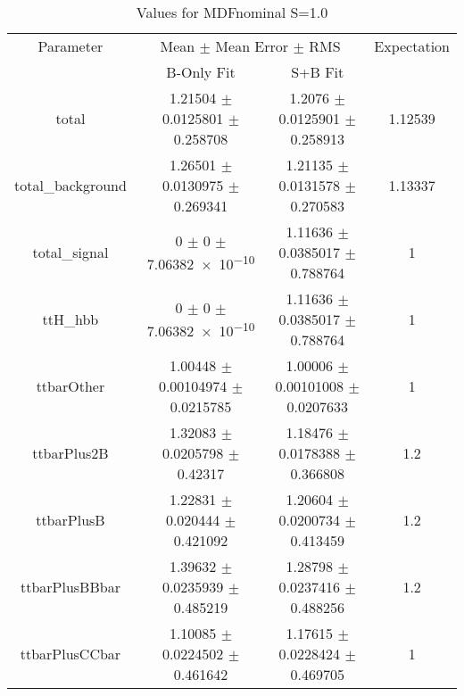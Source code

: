 \begin{table}
\centering
\caption{Values for MDFnominal S=1.0}
\begin{tabular}{cccc}
\toprule
Parameter & \multicolumn{2}{c}{Mean $\pm$ Mean Error $\pm$ RMS} & Expectation\\
 & B-Only Fit & S+B Fit & \\
\midrule
total & \num{1.21504} $\pm$ \num{0.0125801} $\pm$ \num{0.258708} & \num{1.2076} $\pm$ \num{0.0125901} $\pm$ \num{0.258913} & \num{1.12539}\\
total\_background & \num{1.26501} $\pm$ \num{0.0130975} $\pm$ \num{0.269341} & \num{1.21135} $\pm$ \num{0.0131578} $\pm$ \num{0.270583} & \num{1.13337}\\
total\_signal & \num{0} $\pm$ \num{0} $\pm$ \num{7.06382e-10} & \num{1.11636} $\pm$ \num{0.0385017} $\pm$ \num{0.788764} & \num{1}\\
ttH\_hbb & \num{0} $\pm$ \num{0} $\pm$ \num{7.06382e-10} & \num{1.11636} $\pm$ \num{0.0385017} $\pm$ \num{0.788764} & \num{1}\\
ttbarOther & \num{1.00448} $\pm$ \num{0.00104974} $\pm$ \num{0.0215785} & \num{1.00006} $\pm$ \num{0.00101008} $\pm$ \num{0.0207633} & \num{1}\\
ttbarPlus2B & \num{1.32083} $\pm$ \num{0.0205798} $\pm$ \num{0.42317} & \num{1.18476} $\pm$ \num{0.0178388} $\pm$ \num{0.366808} & \num{1.2}\\
ttbarPlusB & \num{1.22831} $\pm$ \num{0.020444} $\pm$ \num{0.421092} & \num{1.20604} $\pm$ \num{0.0200734} $\pm$ \num{0.413459} & \num{1.2}\\
ttbarPlusBBbar & \num{1.39632} $\pm$ \num{0.0235939} $\pm$ \num{0.485219} & \num{1.28798} $\pm$ \num{0.0237416} $\pm$ \num{0.488256} & \num{1.2}\\
ttbarPlusCCbar & \num{1.10085} $\pm$ \num{0.0224502} $\pm$ \num{0.461642} & \num{1.17615} $\pm$ \num{0.0228424} $\pm$ \num{0.469705} & \num{1}\\
\bottomrule
\end{tabular}
\end{table}